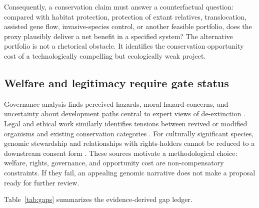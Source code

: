 \documentclass[conference]{IEEEtran}
\begin{document}
Consequently, a conservation claim must answer a counterfactual question: compared with habitat protection, protection of extant relatives, translocation, assisted gene flow, invasive-species control, or another feasible portfolio, does the proxy plausibly deliver a net benefit in a specified system? The alternative portfolio is not a rhetorical obstacle. It identifies the conservation opportunity cost of a technologically compelling but ecologically weak project.

\subsection{Welfare and legitimacy require gate status}

Governance analysis finds perceived hazards, moral-hazard concerns, and uncertainty about development paths central to expert views of de-extinction \cite{valdez2019}. Legal and ethical work similarly identifies tensions between revived or modified organisms and existing conservation categories \cite{sherkow2013,camacho2014}. For culturally significant species, genomic stewardship and relationships with rights-holders cannot be reduced to a downstream consent form \cite{collierrobinson2019}. These sources motivate a methodological choice: welfare, rights, governance, and opportunity cost are non-compensatory constraints. If they fail, an appealing genomic narrative does not make a proposal ready for further review.

Table~\ref{tab:gaps} summarizes the evidence-derived gap ledger.
\end{document}
